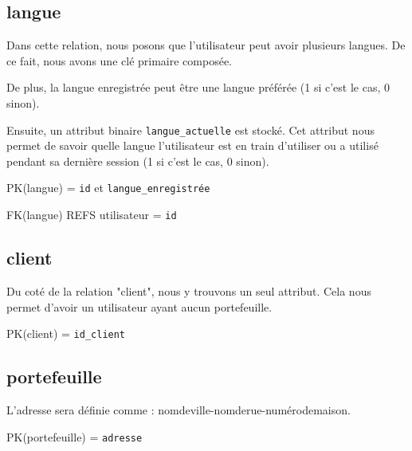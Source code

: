 \subsection{langue}
\begin{flushleft}
Dans cette relation, nous posons que l'utilisateur peut avoir plusieurs langues. De ce fait, nous avons une clé primaire composée. 
\end{flushleft}

\begin{flushleft}
De plus, la langue enregistrée peut être une langue préférée (1 si c'est le cas, 0 sinon). 
\end{flushleft}

\begin{flushleft}
Ensuite, un attribut binaire \texttt{langue\_actuelle} est stocké. Cet attribut nous permet de savoir quelle langue l'utilisateur est en train d'utiliser ou a utilisé pendant sa dernière session (1 si c'est le cas, 0 sinon). 
\end{flushleft}

\begin{flushleft}
PK(langue) = \texttt{id} et \texttt{langue\_enregistrée}
\end{flushleft}

\begin{flushleft}
FK(langue) REFS utilisateur = \texttt{id}
\end{flushleft}
\subsection{client}
\begin{flushleft}
Du coté de la relation "client", nous y trouvons un seul attribut. Cela nous permet d'avoir un utilisateur ayant aucun portefeuille.
\end{flushleft}

\begin{flushleft}
PK(client) = \texttt{id\_client}
\end{flushleft}
\subsection{portefeuille}
\begin{flushleft}
L'adresse sera définie comme : nomdeville-nomderue-numérodemaison. 
\end{flushleft}

\begin{flushleft}
PK(portefeuille) = \texttt{adresse}
\end{flushleft}

